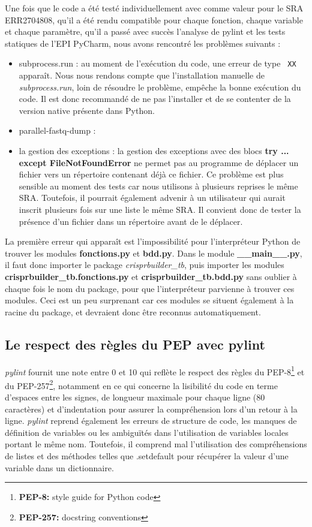 \documentclass[twoside,a4paper,11pt,frenchb,openany]{report}
\begin{document}
Une fois que le code a été testé individuellement avec comme valeur pour le SRA ERR2704808, qu'il a été rendu compatible pour chaque fonction, chaque variable et chaque paramètre, qu'il a passé avec succès l'analyse de pylint et les tests statiques de l'EPI PyCharm, nous avons rencontré les problèmes suivants :  
\begin{itemize}
\item subprocess.run : au moment de l'exécution du code, une erreur de type \texttt{  XX} apparaît. Nous nous rendons compte que l'installation manuelle de \textit{subprocess.run}, loin de résoudre le problème, empêche la bonne exécution du code. Il est donc recommandé de ne pas l'installer et de se contenter de la version native présente dans Python.
\item parallel-fastq-dump :
\item la gestion des exceptions : la gestion des exceptions avec des blocs \textbf{try ... except FileNotFoundError} ne permet pas au programme de déplacer un fichier vers un répertoire contenant déjà ce fichier. Ce problème est plus sensible au moment des tests car nous utilisons à plusieurs reprises le même SRA. Toutefois, il pourrait également advenir à un utilisateur qui aurait inscrit plusieurs fois sur une liste le même SRA. Il convient donc de tester la présence d'un fichier dans un répertoire avant de le déplacer.
\end{itemize}


La première erreur qui apparaît est l'impossibilité pour l'interpréteur Python de trouver les modules \textbf{fonctions.py} et \textbf{bdd.py}. Dans le module \textbf{\_\_main\_\_.py}, il faut donc importer le package \textit{crisprbuilder\_tb}, puis importer les modules \textbf{crisprbuilder\_tb.fonctions.py} et \textbf{crisprbuilder\_tb.bdd.py} sans oublier à chaque fois le nom du package, pour que l'interpréteur parvienne à trouver ces modules. Ceci est un peu surprenant car ces modules se situent également à la racine du package, et devraient donc être reconnus automatiquement.




\subsection{Le respect des règles du PEP avec pylint}

\textit{pylint} fournit une note entre 0 et 10 qui reflète le respect des règles du PEP-8\footnote{\textbf{PEP-8:} style guide for Python code} et du PEP-257\footnote{\textbf{PEP-257:} docstring conventions}, notamment en ce qui concerne la lisibilité du code en terme d'espaces entre les signes, de longueur maximale pour chaque ligne (80 caractères) et d'indentation pour assurer la compréhension lors d'un retour à la ligne. \textit{pylint} reprend également les erreurs de structure de code, les manques de définition de variables ou les ambiguïtés dans l'utilisation de variables locales portant le même nom. Toutefois, il comprend mal l'utilisation des compréhensions de listes et des méthodes telles que .setdefault pour récupérer la valeur d'une variable dans un dictionnaire.
\end{document}

